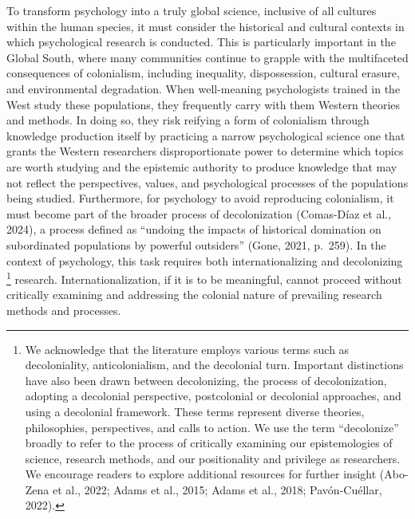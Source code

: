 \documentclass[
  11pt,
]{book}
\begin{document}
To transform psychology into a truly global science, inclusive of all cultures within the human species, it must consider the historical and cultural contexts in which psychological research is conducted. This is particularly important in the Global South, where many communities continue to grapple with the multifaceted consequences of colonialism, including inequality, dispossession, cultural erasure, and environmental degradation. When well-meaning psychologists trained in the West study these populations, they frequently carry with them Western theories and methods. In doing so, they risk reifying a form of colonialism through knowledge production itself by practicing a narrow psychological science one that grants the Western researchers disproportionate power to determine which topics are worth studying and the epistemic authority to produce knowledge that may not reflect the perspectives, values, and psychological processes of the populations being studied. Furthermore, for psychology to avoid reproducing colonialism, it must become part of the broader process of decolonization (Comas-Díaz et al., 2024), a process defined as ``undoing the impacts of historical domination on subordinated populations by powerful outsiders'' (Gone, 2021, p.~259). In the context of psychology, this task requires both internationalizing and decolonizing \footnote{We acknowledge that the literature employs various terms such as decoloniality, anticolonialism, and the decolonial turn. Important distinctions have also been drawn between decolonizing, the process of decolonization, adopting a decolonial perspective, postcolonial or decolonial approaches, and using a decolonial framework. These terms represent diverse theories, philosophies, perspectives, and calls to action. We use the term ``decolonize'' broadly to refer to the process of critically examining our epistemologies of science, research methods, and our positionality and privilege as researchers. We encourage readers to explore additional resources for further insight (Abo-Zena et al., 2022; Adams et al., 2015; Adams et al., 2018; Pavón-Cuéllar, 2022).} research. Internationalization, if it is to be meaningful, cannot proceed without critically examining and addressing the colonial nature of prevailing research methods and processes.
\end{document}
